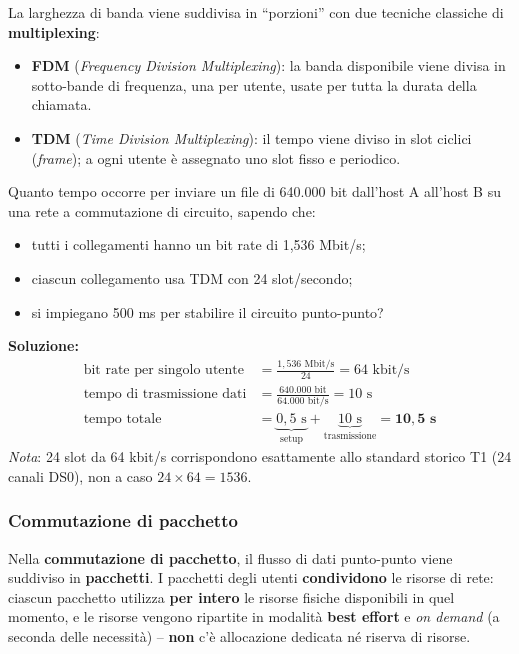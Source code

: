 \documentclass[12pt, a4paper]{article}
\begin{document}
La larghezza di banda viene suddivisa in ``porzioni'' con due tecniche classiche di \textbf{multiplexing}:

\begin{itemize}
    \item \textbf{FDM} (\textit{Frequency Division Multiplexing}): la banda disponibile viene divisa in sotto-bande di frequenza, una per utente, usate per tutta la durata della chiamata.
    \item \textbf{TDM} (\textit{Time Division Multiplexing}): il tempo viene diviso in slot ciclici (\textit{frame}); a ogni utente è assegnato uno slot fisso e periodico.
\end{itemize}

\begin{tcolorbox}[colback=orange!5, colframe=orange!70!black, title=\textbf{Esercizio 1.2 -- Tempo di trasmissione a commutazione di circuito}]
Quanto tempo occorre per inviare un file di 640.000 bit dall'host A all'host B su una rete a commutazione di circuito, sapendo che:
\begin{itemize}
    \item tutti i collegamenti hanno un bit rate di 1,536 Mbit/s;
    \item ciascun collegamento usa TDM con 24 slot/secondo;
    \item si impiegano 500 ms per stabilire il circuito punto-punto?
\end{itemize}

\textbf{Soluzione:}
\begin{align*}
\text{bit rate per singolo utente} &= \frac{1{,}536 \text{ Mbit/s}}{24} = 64 \text{ kbit/s} \\
\text{tempo di trasmissione dati} &= \frac{640.000 \text{ bit}}{64.000 \text{ bit/s}} = 10 \text{ s} \\
\text{tempo totale} &= \underbrace{0{,}5 \text{ s}}_{\text{setup}} + \underbrace{10 \text{ s}}_{\text{trasmissione}} = \mathbf{10{,}5 \text{ s}}
\end{align*}
\textit{Nota}: 24 slot da 64 kbit/s corrispondono esattamente allo standard storico T1 (24 canali DS0), non a caso $24 \times 64 = 1536$.
\end{tcolorbox}

\subsubsection{Commutazione di pacchetto}

Nella \textbf{commutazione di pacchetto}, il flusso di dati punto-punto viene suddiviso in \textbf{pacchetti}. I pacchetti degli utenti \textbf{condividono} le risorse di rete: ciascun pacchetto utilizza \textbf{per intero} le risorse fisiche disponibili in quel momento, e le risorse vengono ripartite in modalità \textbf{best effort} e \textit{on demand} (a seconda delle necessità) -- \textbf{non} c'è allocazione dedicata né riserva di risorse.
\end{document}
